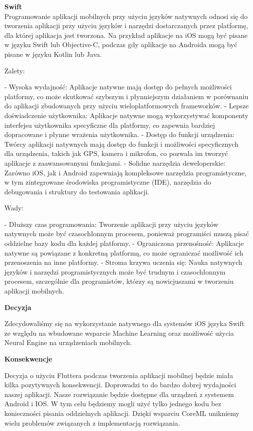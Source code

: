 \documentclass[12pt, a4paper, twoside, openany]{book}
\begin{document}
\textbf{Swift\\}
Programowanie aplikacji mobilnych przy użyciu języków natywnych odnosi się do tworzenia aplikacji przy użyciu języków i narzędzi dostarczanych przez platformę, dla której aplikacja jest tworzona. Na przykład aplikacje na iOS mogą być pisane w języku Swift lub Objective-C, podczas gdy aplikacje na Androida mogą być pisane w języku Kotlin lub Java.
    
Zalety:

- Wysoka wydajność: Aplikacje natywne mają dostęp do pełnych możliwości platformy, co może skutkować szybszym i płynniejszym działaniem w porównaniu do aplikacji zbudowanych przy użyciu wieloplatformowych frameworków.
- Lepsze doświadczenie użytkownika: Aplikacje natywne mogą wykorzystywać komponenty interfejsu użytkownika specyficzne dla platformy, co zapewnia bardziej dopracowane i płynne wrażenia użytkownika.
- Dostęp do funkcji urządzenia: Twórcy aplikacji natywnych mają dostęp do funkcji i możliwości specyficznych dla urządzenia, takich jak GPS, kamera i mikrofon, co pozwala im tworzyć aplikacje z zaawansowanymi funkcjami.
- Solidne narzędzia deweloperskie: Zarówno iOS, jak i Android zapewniają kompleksowe narzędzia programistyczne, w tym zintegrowane środowiska programistyczne (IDE), narzędzia do debugowania i struktury do testowania aplikacji.

Wady:

- Dłuższy czas programowania: Tworzenie aplikacji przy użyciu języków natywnych może być czasochłonnym procesem, ponieważ programiści muszą pisać oddzielne bazy kodu dla każdej platformy.
- Ograniczona przenośność: Aplikacje natywne są powiązane z konkretną platformą, co może ograniczać możliwość ich przenoszenia na inne platformy.
- Stroma krzywa uczenia się: Nauka natywnych języków i narzędzi programistycznych może być trudnym i czasochłonnym procesem, szczególnie dla programistów, którzy są nowicjuszami w tworzeniu aplikacji mobilnych.

\textbf{Decyzja\\}

Zdecydowaliśmy się na wykorzystanie natywnego dla systemów iOS języka Swift ze względu na wbudowane wsparcie Machine Learning oraz możliwość użycia Neural Engine na urządzeniach mobilnych.

\textbf{Konsekwencje\\}

Decyzja o użyciu Fluttera podczas tworzenia aplikacji mobilnej będzie miała kilka pozytywnych konsekwencji. Doprowadzi to do bardzo dobrej wydajności naszej aplikacji. Nasze rozwiązanie będzie dostępne dla urządzeń z systemem Android i IOS. W tym celu będziemy mogli użyć tylko jednego kodu bez konieczności pisania oddzielnych aplikacji. Dzięki wsparciu CoreML unikniemy wielu problemów związanych z implementacją rozwiązania.
\end{document}
